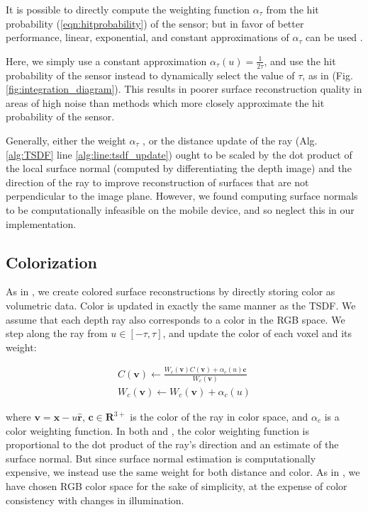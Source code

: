 \documentclass[conference]{IEEEtran}
\newcommand{\eref}[1]{(\ref{#1})}
\newcommand{\figref}[1]{Fig.\ref{#1}}
\newcommand{\algoref}[1]{Alg.\ref{#1}}
\begin{document}
 It is possible \cite{Nguyen2012} to directly compute the weighting function
 $\alpha_{\tau}$ from the hit probability \eref{eqn:hitprobability} of the
 sensor; but in favor of better performance, linear, exponential, and constant
 approximations of $\alpha_{\tau}$ can be used \cite{Curless1996, Newcombe,
 Whelan2013, Bylow2013}.

Here, we simply use a constant approximation $\alpha_{\tau}(u) = \frac{1}{2
\tau}$, and use the hit probability of the sensor instead to  dynamically select
the value of $\tau$, as in \cite{Nguyen2012} (\figref{fig:integration_diagram}).
This results in poorer surface reconstruction quality in areas of high noise
than methods which more closely approximate the hit probability of the sensor.

Generally, either the weight $\alpha_{\tau}$ \cite{Newcombe, Whelan2013}, or
the distance update of the ray (\algoref{alg:TSDF} line
\ref{alg:line:tsdf_update}) \cite{Curless1996, Bylow2013} ought to be scaled by
the dot product of the local surface normal (computed by differentiating the
depth image) and the direction of the ray to improve reconstruction of surfaces
that are not perpendicular to the image plane. However, we found computing
surface normals to be computationally infeasible on the mobile device, and so
neglect this in our implementation.

\subsection{Colorization}
\label{section:color}
As in \cite{Bylow2013, Whelan2013}, we create colored surface reconstructions by
directly storing color as volumetric data. Color is updated in exactly the same
manner as the TSDF.  We assume that each depth ray also corresponds to a color
in the RGB space. We step along the ray from $u \in [-\tau, \tau]$, and update
the color of each voxel and its weight:

\begin{align}
C(\mathbf{v}) \gets \frac{W_c(\mathbf{v}) C(\mathbf{v}) +
\alpha_c(u) \mathbf{c}}{W_c(\mathbf{v})}
\\
%
W_c(\mathbf{v}) \gets W_c(\mathbf{v}) + \alpha_c(u)
\end{align}

\noindent where $\mathbf{v} = \mathbf{x} - u\mathbf{\hat{r}}$,  $\mathbf{c}
\in \mathbf{R}^{3+}$ is the color of the ray in color space, and $\alpha_c$ is a
color weighting function. In both \cite{Bylow2013} and \cite{Whelan2013}, the
color weighting function is proportional to the dot product of the ray's
direction and an estimate of the surface normal. But since surface normal
estimation is computationally expensive, we instead use the same weight for
both distance and color. As in \cite{Bylow2013},
we have chosen RGB color space for the sake of simplicity, at the expense of
color consistency with changes in illumination.
\end{document}
